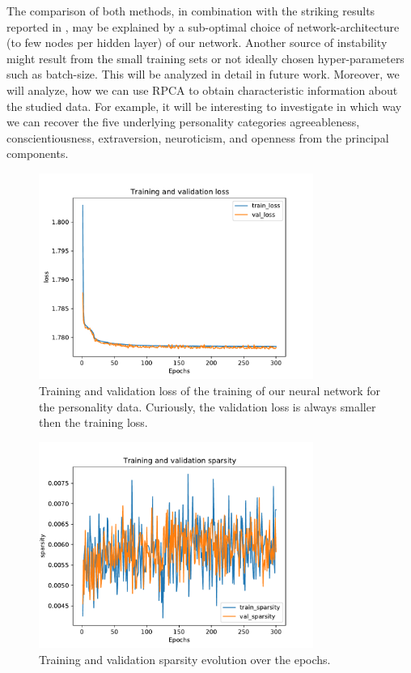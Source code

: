 The comparison of both methods, in combination with the striking results reported in \cite{herrera2020denise}, may be explained by a sub-optimal choice of network-architecture (to few nodes per hidden layer) of our network. Another source of instability might result from the small training sets or not ideally chosen hyper-parameters such as batch-size. This will be analyzed in detail in future work. Moreover, we will analyze, how we can use RPCA to obtain characteristic information about the studied data. For example, it will be interesting to investigate in which way we can recover the five underlying personality categories agreeableness, conscientiousness, extraversion, neuroticism, and openness from the principal components.


\begin{figure}
	\centering
	\includegraphics[width=0.8\textwidth]{fig/loss_psych.pdf}
	\caption{Training and validation loss of the training of our neural network for the personality data. Curiously, the validation loss is always smaller then the training loss.}
	\label{fig:personality_training}
\end{figure}
\begin{figure}
	\centering
	\includegraphics[width=0.8\textwidth]{fig/sparsity_psych.pdf}
	\caption{Training and validation sparsity evolution over the epochs.}
	\label{fig:personality_sparsity}
\end{figure}


